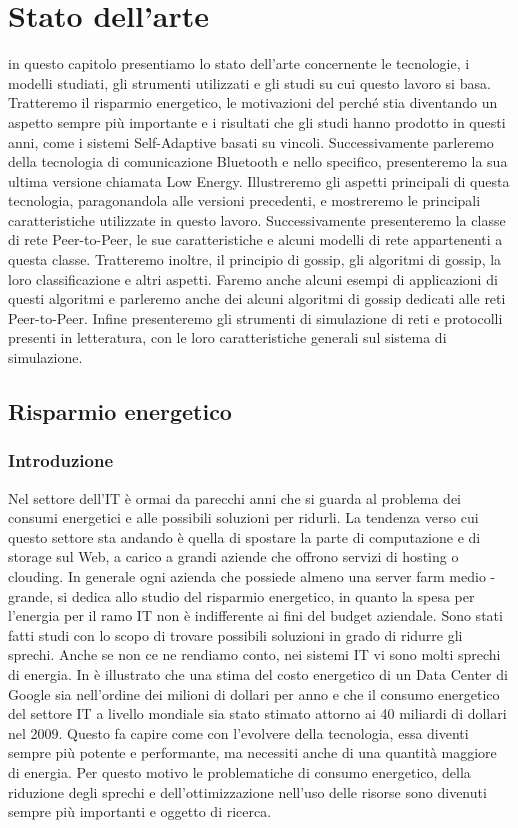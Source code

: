 \chapter{Stato dell'arte}
\label{chap:Stato dell'arte}

in questo capitolo presentiamo lo stato dell'arte concernente le tecnologie, i modelli studiati, gli strumenti utilizzati e gli studi su cui questo lavoro si basa. Tratteremo il risparmio energetico, le motivazioni del perché stia diventando un aspetto sempre più importante e i risultati che gli studi hanno prodotto in questi anni, come i sistemi Self-Adaptive basati su vincoli. Successivamente parleremo della tecnologia di comunicazione Bluetooth e nello specifico, presenteremo la sua ultima versione chiamata Low Energy. Illustreremo gli aspetti principali di questa tecnologia, paragonandola alle versioni precedenti, e mostreremo le principali caratteristiche utilizzate in questo lavoro. Successivamente presenteremo la classe di rete Peer-to-Peer, le sue caratteristiche e alcuni modelli di rete appartenenti a questa classe. Tratteremo inoltre, il principio di gossip, gli algoritmi di gossip, la loro classificazione e altri aspetti. Faremo anche alcuni esempi di applicazioni di questi algoritmi e parleremo anche dei alcuni algoritmi di gossip dedicati alle reti Peer-to-Peer. Infine presenteremo gli strumenti di simulazione di reti e protocolli presenti in letteratura, con le loro caratteristiche generali sul sistema di simulazione.

\section{Risparmio energetico}
\subsection{Introduzione}
Nel settore dell'\acf{IT} è ormai da parecchi anni che si guarda al problema dei consumi energetici e alle possibili soluzioni per ridurli. La tendenza verso cui questo settore sta andando è quella di spostare la parte di computazione e di storage sul Web, a carico a grandi aziende che offrono servizi di hosting o clouding. In generale ogni azienda che possiede almeno una server farm medio - grande, si dedica allo studio del risparmio energetico, in quanto la spesa per l'energia per il ramo \acs{IT} non è indifferente ai fini del budget aziendale. Sono stati fatti studi con lo scopo di trovare possibili soluzioni in grado di ridurre gli sprechi. Anche se non ce ne rendiamo conto, nei sistemi \acs{IT} vi sono molti sprechi di energia. In \cite{ranganathan2010-pac} è illustrato che una stima del costo energetico di un Data Center di Google sia nell'ordine dei milioni di dollari per anno e che il consumo energetico del settore \acs{IT} a livello mondiale sia stato stimato attorno ai 40 miliardi di dollari nel 2009. Questo fa capire come con l'evolvere della tecnologia, essa diventi sempre più potente e performante, ma necessiti anche di una quantità maggiore di energia. Per questo motivo le problematiche di consumo energetico, della riduzione degli sprechi e dell'ottimizzazione nell'uso delle risorse sono divenuti sempre più importanti e oggetto di ricerca.

